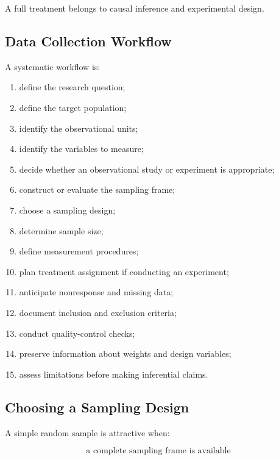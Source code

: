A full treatment belongs to causal inference and experimental design.

\subsection{Data Collection Workflow}
\label{subsec:data-collection-workflow}

A systematic workflow is:

\begin{enumerate}
    \item define the research question;
    \item define the target population;
    \item identify the observational units;
    \item identify the variables to measure;
    \item decide whether an observational study or experiment is
          appropriate;
    \item construct or evaluate the sampling frame;
    \item choose a sampling design;
    \item determine sample size;
    \item define measurement procedures;
    \item plan treatment assignment if conducting an experiment;
    \item anticipate nonresponse and missing data;
    \item document inclusion and exclusion criteria;
    \item conduct quality-control checks;
    \item preserve information about weights and design variables;
    \item assess limitations before making inferential claims.
\end{enumerate}

\subsection{Choosing a Sampling Design}
\label{subsec:choosing-sampling-design}

A simple random sample is attractive when:

\[
\boxed{
\text{a complete sampling frame is available}
}
\]

